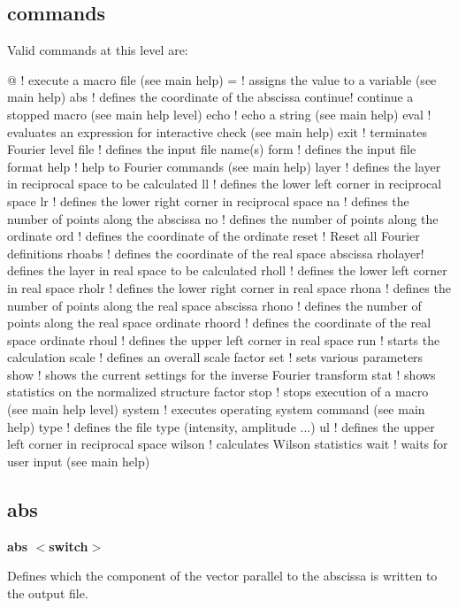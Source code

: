 \subsection*{commands}
Valid commands at this level are: 
\par
\begin{MacVerbatim}
@       ! execute a macro file (see main help)
=       ! assigns the value to a variable (see main help)
abs     ! defines the coordinate of the abscissa
continue! continue a stopped macro (see main help level)
echo    ! echo a string (see main help)
eval    ! evaluates an expression for interactive check (see main help)
exit    ! terminates Fourier level
file    ! defines the input file name(s)
form    ! defines the input file format
help    ! help to Fourier commands (see main help)
layer   ! defines the layer in reciprocal space to be calculated
ll      ! defines the lower left corner in reciprocal space
lr      ! defines the lower right corner in reciprocal space
na      ! defines the number of points along the abscissa
no      ! defines the number of points along the ordinate
ord     ! defines the coordinate of the ordinate
reset   ! Reset all Fourier definitions
rhoabs  ! defines the coordinate of the real space abscissa
rholayer! defines the layer in real space to be calculated
rholl   ! defines the lower left corner in real space
rholr   ! defines the lower right corner in real space
rhona   ! defines the number of points along the real space abscissa
rhono   ! defines the number of points along the real space ordinate
rhoord  ! defines the coordinate of the real space ordinate
rhoul   ! defines the upper left corner in real space
run     ! starts the calculation
scale   ! defines an overall scale factor
set     ! sets various parameters
show    ! shows the current settings for the inverse Fourier transform
stat    ! shows statistics on the normalized structure factor
stop    ! stops execution of a macro (see main help level)
system  ! executes operating system command (see main help)
type    ! defines the file type (intensity, amplitude ...)
ul      ! defines the upper left corner in reciprocal space
wilson  ! calculates Wilson statistics
wait    ! waits for user input (see main help)
\end{MacVerbatim}
\subsection*{abs}
{\bf abs $ <$switch$> $ \par }
\par
\vspace{3pt}
Defines which the component of the vector parallel to the abscissa 
is written to the output file. 
